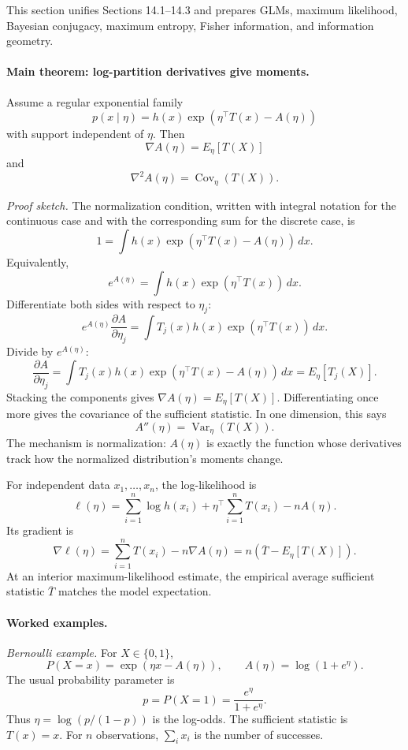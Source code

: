 This section unifies Sections 14.1--14.3 and prepares GLMs, maximum likelihood, Bayesian conjugacy, maximum entropy, Fisher information, and information geometry.

\paragraph{Main theorem: log-partition derivatives give moments.}
Assume a regular exponential family
\[
p(x\mid\eta)=h(x)\exp\!\left(\eta^\top T(x)-A(\eta)\right)
\]
with support independent of \(\eta\). Then
\[
\boxed{\nabla A(\eta)=E_\eta[T(X)]}
\]
and
\[
\boxed{\nabla^2 A(\eta)=\operatorname{Cov}_\eta(T(X)).}
\]

\emph{Proof sketch.}
The normalization condition, written with integral notation for the continuous case and with the corresponding sum for the discrete case, is
\[
1=\int h(x)\exp\!\left(\eta^\top T(x)-A(\eta)\right)\,dx.
\]
Equivalently,
\[
e^{A(\eta)}
=
\int h(x)\exp\!\left(\eta^\top T(x)\right)\,dx.
\]
Differentiate both sides with respect to \(\eta_j\):
\[
e^{A(\eta)}\frac{\partial A}{\partial\eta_j}
=
\int T_j(x)h(x)\exp\!\left(\eta^\top T(x)\right)\,dx.
\]
Divide by \(e^{A(\eta)}\):
\[
\frac{\partial A}{\partial\eta_j}
=
\int T_j(x)h(x)\exp\!\left(\eta^\top T(x)-A(\eta)\right)\,dx
=E_\eta[T_j(X)].
\]
Stacking the components gives \(\nabla A(\eta)=E_\eta[T(X)]\). Differentiating once more gives the covariance of the sufficient statistic. In one dimension, this says
\[
A''(\eta)=\operatorname{Var}_\eta(T(X)).
\]
The mechanism is normalization: \(A(\eta)\) is exactly the function whose derivatives track how the normalized distribution's moments change.

For independent data \(x_1,\ldots,x_n\), the log-likelihood is
\[
\ell(\eta)
=
\sum_{i=1}^n \log h(x_i)
+\eta^\top\sum_{i=1}^n T(x_i)
-nA(\eta).
\]
Its gradient is
\[
\nabla\ell(\eta)
=
\sum_{i=1}^n T(x_i)-n\nabla A(\eta)
=
n\left(\overline T-E_\eta[T(X)]\right).
\]
At an interior maximum-likelihood estimate, the empirical average sufficient statistic \(\overline T\) matches the model expectation.

\paragraph{Worked examples.}
\emph{Bernoulli example.} For \(X\in\{0,1\}\),
\[
P(X=x)=\exp(\eta x-A(\eta)),
\qquad
A(\eta)=\log(1+e^\eta).
\]
The usual probability parameter is
\[
p=P(X=1)=\frac{e^\eta}{1+e^\eta}.
\]
Thus \(\eta=\log(p/(1-p))\) is the log-odds. The sufficient statistic is \(T(x)=x\). For \(n\) observations, \(\sum_i x_i\) is the number of successes.

